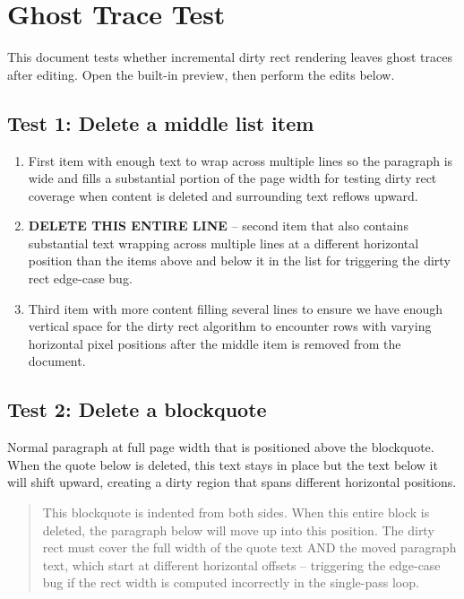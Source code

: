 \documentclass[12pt]{article}
\begin{document}
\section{Ghost Trace Test}

This document tests whether incremental dirty rect rendering leaves ghost traces
after editing. Open the built-in preview, then perform the edits below.

\subsection{Test 1: Delete a middle list item}

\begin{enumerate}
      \item First item with enough text to wrap across multiple lines so the paragraph is
            wide and fills a substantial portion of the page width for testing dirty rect
            coverage when content is deleted and surrounding text reflows upward.
      \item \textbf{DELETE THIS ENTIRE LINE} -- second item that also contains substantial
            text wrapping across multiple lines at a different horizontal position than the
            items above and below it in the list for triggering the dirty rect edge-case bug.
      \item Third item with more content filling several lines to ensure we have enough
            vertical space for the dirty rect algorithm to encounter rows with varying
            horizontal pixel positions after the middle item is removed from the document.
\end{enumerate}

\subsection{Test 2: Delete a blockquote}

Normal paragraph at full page width that is positioned above the blockquote.
When the quote below is deleted, this text stays in place but the text below
it will shift upward, creating a dirty region that spans different horizontal
positions.

\begin{quote}
      This blockquote is indented from both sides. When this entire block is deleted,
      the paragraph below will move up into this position. The dirty rect must cover
      the full width of the quote text AND the moved paragraph text, which start at
      different horizontal offsets -- triggering the edge-case bug if the rect width
      is computed incorrectly in the single-pass loop.
\end{quote}
\end{document}
